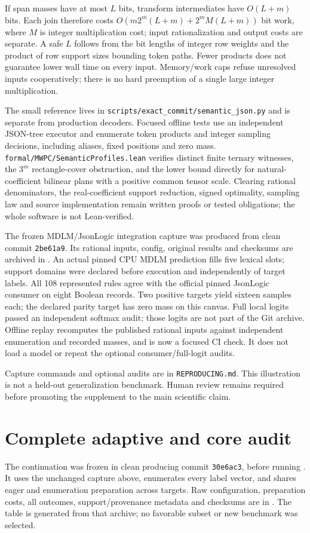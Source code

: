 \documentclass[11pt,a4paper]{article}
\begin{document}
If span masses have at most $L$ bits, transform intermediates have $O(L+m)$
bits. Each join therefore costs
$O(m2^m(L+m)+2^mM(L+m))$ bit work, where $M$ is integer multiplication cost;
input rationalization and output costs are separate. A safe $L$ follows from
the bit lengths of integer row weights and the product of row support sizes
bounding token paths. Fewer products does not guarantee lower wall time on
every input. Memory/work caps refuse unresolved inputs cooperatively; there
is no hard preemption of a single large integer multiplication.

The small reference lives in \texttt{scripts/exact\_commit/semantic\_json.py}
and is separate from production decoders. Focused offline tests use an
independent JSON-tree executor and enumerate token products and integer
sampling decisions, including aliases, fixed positions and zero mass.
\texttt{formal/MWPC/SemanticProfiles.lean} verifies distinct finite ternary
witnesses, the $3^m$ rectangle-cover obstruction, and the lower bound directly
for natural-coefficient bilinear plans with a positive common tensor scale.
Clearing rational denominators, the real-coefficient support reduction, signed
optimality, sampling law and source implementation remain written proofs or
tested obligations; the whole software is not Lean-verified.

The frozen MDLM/JsonLogic integration capture was produced from clean commit
\texttt{2be61a9}. Its rational inputs, config, original results and checksums
are archived in .
An actual pinned CPU MDLM prediction fills five lexical slots; support domains
were declared before execution and independently of target labels. All 108
represented rules agree with the official pinned JsonLogic consumer on eight
Boolean records. Two positive targets yield sixteen samples each; the declared
parity target has zero mass on this canvas. Full local logits passed an
independent softmax audit; those logits are not part of the Git archive.
Offline replay recomputes the published rational inputs against independent
enumeration and recorded masses, and is now a focused CI check. It does not
load a model or repeat the optional consumer/full-logit audits.

Capture commands and optional audits are in \texttt{REPRODUCING.md}.
This illustration is not a held-out generalization benchmark. Human review
remains required before promoting the supplement to the main scientific claim.

\section{Complete adaptive and core audit}
The continuation was frozen in clean producing commit \texttt{30e6ac3}, before
running . It uses the
unchanged capture above, enumerates every label vector, and shares eager and
enumeration preparation across targets. Raw configuration, preparation costs,
all outcomes, support/provenance metadata and checksums are in
. The table is generated
from that archive; no favorable subset or new benchmark was selected.
\end{document}
